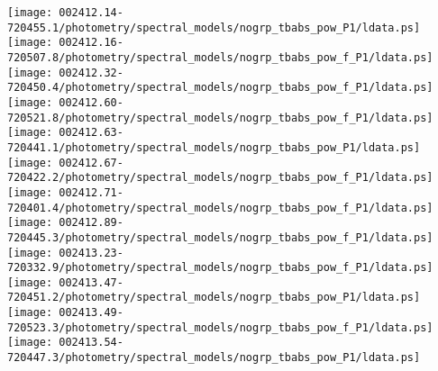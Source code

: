 \documentclass{aastex}
\begin{document}
\begin{figure*}[!ht]
\centering
\texttt{[image: 002412.14-720455.1/photometry/spectral\_models/nogrp\_tbabs\_pow\_P1/ldata.ps]} \hfill 
\texttt{[image: 002412.16-720507.8/photometry/spectral\_models/nogrp\_tbabs\_pow\_f\_P1/ldata.ps]} \hfill 
\texttt{[image: 002412.32-720450.4/photometry/spectral\_models/nogrp\_tbabs\_pow\_f\_P1/ldata.ps]} \\ 
\vspace*{0.5in}
\texttt{[image: 002412.60-720521.8/photometry/spectral\_models/nogrp\_tbabs\_pow\_f\_P1/ldata.ps]} \hfill 
\texttt{[image: 002412.63-720441.1/photometry/spectral\_models/nogrp\_tbabs\_pow\_P1/ldata.ps]} \hfill 
\texttt{[image: 002412.67-720422.2/photometry/spectral\_models/nogrp\_tbabs\_pow\_f\_P1/ldata.ps]} \\ 
\vspace*{0.5in}
\texttt{[image: 002412.71-720401.4/photometry/spectral\_models/nogrp\_tbabs\_pow\_f\_P1/ldata.ps]} \hfill 
\texttt{[image: 002412.89-720445.3/photometry/spectral\_models/nogrp\_tbabs\_pow\_f\_P1/ldata.ps]} \hfill 
\texttt{[image: 002413.23-720332.9/photometry/spectral\_models/nogrp\_tbabs\_pow\_f\_P1/ldata.ps]} \\ 
\vspace*{0.5in}
\texttt{[image: 002413.47-720451.2/photometry/spectral\_models/nogrp\_tbabs\_pow\_P1/ldata.ps]} \hfill 
\texttt{[image: 002413.49-720523.3/photometry/spectral\_models/nogrp\_tbabs\_pow\_f\_P1/ldata.ps]} \hfill 
\texttt{[image: 002413.54-720447.3/photometry/spectral\_models/nogrp\_tbabs\_pow\_P1/ldata.ps]} \\ 
\vspace*{0.5in}
\end{figure*}
\clearpage
\end{document}
